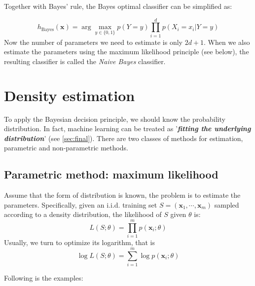 \documentclass{article}
\begin{document}
	Together with Bayes' rule, the Bayes optimal classifier can be simplified as:
	
	\begin{equation}
	h_{\mathrm{Bayes}}(\bm{x}) = \arg\max\limits_{y\in\{0,1\}} p (Y=y) \prod_{i=1}^d p (X_i=x_i|Y=y)
	\end{equation}
Now the number of parameters we need to estimate is only $2d + 1$. When we also estimate the parameters using the maximum likelihood principle (see below), the resulting classifier is called the \textit{Naive Bayes} classifier.

\section{Density estimation}

	To apply the Bayesian decision principle, we should know the probability distribution. In fact, machine learning can be treated as '\textbf{\textit{fitting the underlying distribution}}' (see \ref{sec:final}). There are two classes of methods for estimation, parametric and non-parametric methods.
	
	\subsection{Parametric method: maximum likelihood}
	Assume that the form of distribution is known, the problem is to estimate the parameters. Specifically, given an i.i.d. training set $S = (\bm{x}_1,\cdots,\bm{x}_m)$ sampled according to a density distribution, the likelihood of $S$ given $\theta$ is:
	\begin{equation*}
	L(S;\theta) = \prod_{i=1}^m  p(\bm{x}_i;\theta)
	\end{equation*}
Usually, we turn to optimize its logarithm, that is
	\begin{equation}
	\log L(S;\theta) = \sum_{i=1}^m \log p(\bm{x}_i;\theta)
	\end{equation}
	
	Following is the examples:
	
\end{document}
